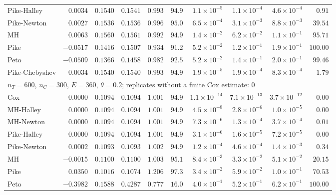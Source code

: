 \begin{landscape}
\begin{longtable}{lrrrrrrrrr}
Pike-Halley & $0.0034$ & $0.1540$ & $0.1541$ & $0.993$ & $94.9$ & $1.1 \times 10^{-5}$ & $1.1 \times 10^{-4}$ & $4.6 \times 10^{-4}$ & $0.91$ \\
Pike-Newton & $0.0027$ & $0.1536$ & $0.1536$ & $0.996$ & $95.0$ & $6.5 \times 10^{-4}$ & $3.1 \times 10^{-3}$ & $8.8 \times 10^{-3}$ & $39.54$ \\
MH & $0.0063$ & $0.1560$ & $0.1561$ & $0.992$ & $94.9$ & $1.4 \times 10^{-2}$ & $6.2 \times 10^{-2}$ & $1.1 \times 10^{-1}$ & $95.71$ \\
Pike & $-0.0517$ & $0.1416$ & $0.1507$ & $0.934$ & $91.2$ & $5.2 \times 10^{-2}$ & $1.2 \times 10^{-1}$ & $1.9 \times 10^{-1}$ & $100.00$ \\
Peto & $-0.0509$ & $0.1366$ & $0.1458$ & $0.982$ & $92.5$ & $5.2 \times 10^{-2}$ & $1.4 \times 10^{-1}$ & $2.0 \times 10^{-1}$ & $99.46$ \\
Pike-Chebyshev & $0.0034$ & $0.1540$ & $0.1540$ & $0.993$ & $94.9$ & $1.9 \times 10^{-5}$ & $1.9 \times 10^{-4}$ & $8.3 \times 10^{-4}$ & $1.79$ \\
\multicolumn{10}{l}{$n_T = 600$, $n_C = 300$, $E = 360$, $\theta = 0.2$; replicates without a finite Cox estimate: 0} \\
Cox & $0.0000$ & $0.1094$ & $0.1094$ & $1.001$ & $94.9$ & $1.1 \times 10^{-14}$ & $7.1 \times 10^{-13}$ & $3.7 \times 10^{-12}$ & $0.00$ \\
MH-Halley & $0.0000$ & $0.1094$ & $0.1094$ & $1.001$ & $94.9$ & $4.5 \times 10^{-8}$ & $2.8 \times 10^{-6}$ & $1.0 \times 10^{-5}$ & $0.00$ \\
MH-Newton & $0.0000$ & $0.1094$ & $0.1094$ & $1.001$ & $94.9$ & $7.3 \times 10^{-6}$ & $1.3 \times 10^{-4}$ & $3.7 \times 10^{-4}$ & $0.01$ \\
Pike-Halley & $0.0000$ & $0.1094$ & $0.1094$ & $1.001$ & $94.9$ & $3.1 \times 10^{-6}$ & $1.6 \times 10^{-5}$ & $7.2 \times 10^{-5}$ & $0.00$ \\
Pike-Newton & $0.0002$ & $0.1093$ & $0.1093$ & $1.002$ & $94.9$ & $1.2 \times 10^{-4}$ & $4.6 \times 10^{-4}$ & $1.4 \times 10^{-3}$ & $0.34$ \\
MH & $-0.0015$ & $0.1100$ & $0.1100$ & $1.003$ & $95.1$ & $8.4 \times 10^{-3}$ & $3.3 \times 10^{-2}$ & $5.1 \times 10^{-2}$ & $20.15$ \\
Pike & $0.0350$ & $0.1016$ & $0.1074$ & $1.206$ & $97.3$ & $3.4 \times 10^{-2}$ & $5.9 \times 10^{-2}$ & $1.0 \times 10^{-1}$ & $70.53$ \\
Peto & $-0.3982$ & $0.1588$ & $0.4287$ & $0.777$ & $16.0$ & $4.0 \times 10^{-1}$ & $5.2 \times 10^{-1}$ & $6.2 \times 10^{-1}$ & $100.00$ \\

\end{longtable}
\end{landscape}
